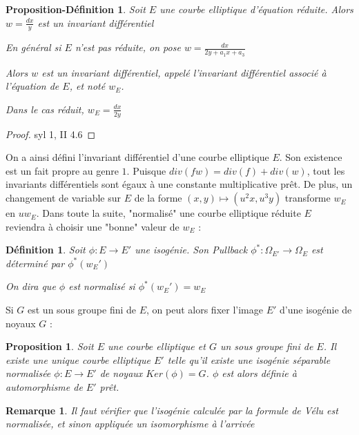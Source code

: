 \documentclass{article}
\newtheorem{Prop}[The]{Proposition}
\newtheorem{Prod}[The]{Proposition-Définition}
\newtheorem{Def}[The]{Définition}
\newtheorem{Rem}[The]{Remarque}
\begin{document}
\begin{Prod}
	Soit $E$ une courbe elliptique d'équation réduite. Alors $w = \frac{dx}{y}$ est un invariant différentiel
	
	En général si $E$ n'est pas réduite, on pose $w = \frac{dx}{2y + a_{1}x + a_{3}}$
	
	Alors $w$ est un invariant différentiel, appelé l'invariant différentiel associé à l'équation de $E$, et noté $w_E$.
	
	Dans le cas réduit, $w_E = \frac{dx}{2y} $
\end{Prod}

\begin{proof}
	syl 1, II 4.6
\end{proof}

On a ainsi défini l'invariant différentiel d'une courbe elliptique $E$. Son existence est un fait propre au genre $1$. Puisque $div(fw) = div(f) + div(w)$, tout les invariants différentiels sont égaux à une constante multiplicative prêt. De plus, un changement de variable sur $E$ de la forme $(x,y)\mapsto(u^{2}x,u^{3}y)$ transforme $w_E$ en $uw_E$. Dans toute la suite, "normalisé" une courbe elliptique réduite $E$ reviendra à choisir une "bonne" valeur de $w_E$ :

\begin{Def}
	
	Soit $\phi : E\rightarrow E'$ une isogénie. Son Pullback $\phi^{*} : \Omega_{E'} \rightarrow \Omega_{E}$ est déterminé par $\phi^{*}(w_E')$
	
	On dira que $\phi$ est normalisé si $\phi^{*}(w_E') = w_E$
	
\end{Def}

Si $G$ est un sous groupe fini de $E$, on peut alors fixer l'image $E'$ d'une isogénie de noyaux $G$ :

\begin{Prop}
	Soit $E$ une courbe elliptique et $G$ un sous groupe fini de $E$. Il existe une unique courbe elliptique $E'$ telle qu'il existe une isogénie séparable normalisée $\phi : E \rightarrow E'$ de noyaux $Ker(\phi) = G$. $\phi$ est alors définie à automorphisme de $E'$ prêt.
\end{Prop}

\begin{Rem}
	Il faut vérifier que l'isogénie calculée par la formule de Vélu est normalisée, et sinon appliquée un isomorphisme à l'arrivée
\end{Rem}
\end{document}
